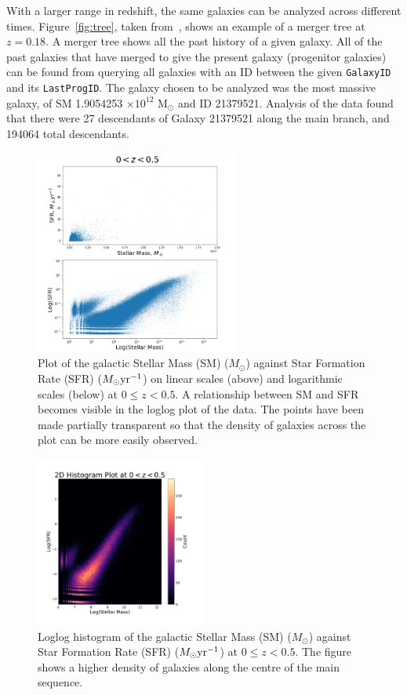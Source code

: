 \documentclass[12pt]{article}
\begin{document}
With a larger range in redshift, the same galaxies can be analyzed across different times.  Figure~\ref{fig:tree}, taken from~\cite{EAGLE}, shows an example of a merger tree at $z=0.18$.  A merger tree shows all the past history of a given galaxy.  All of the past galaxies that have merged to give the present galaxy (progenitor galaxies) can be found from querying all galaxies with an ID between the given {\tt GalaxyID} and its {\tt LastProgID}.  The galaxy chosen to be analyzed was the most massive galaxy, of SM 1.9054253 $\times10^{12}$ M$_\odot$ and ID 21379521.  Analysis of the data found that there were 27 descendants of Galaxy 21379521 along the main branch, and 194064 total descendants.

\begin{figure}[htbp]
  \centerline{\includegraphics[width=0.6\textwidth]{SMvSFR2.png}}
  \caption{Plot of the galactic Stellar Mass (SM) ($M_\odot$) against Star Formation Rate (SFR) ($M_\odot\rm{yr}^{-1}$) on linear scales (above) and logarithmic scales (below) at $0\leq z < 0.5$.  A relationship between SM and SFR becomes visible in the loglog plot of the data.  The points have been made partially transparent so that the density of galaxies across the plot can be more easily observed.}
  \label{fig:SMvSFR2}
\end{figure}

\begin{figure}[htbp]
  \centerline{\includegraphics[width=0.5\textwidth]{hist2.pdf}}
    \caption{Loglog histogram of the galactic Stellar Mass (SM) ($M_\odot$) against Star Formation Rate (SFR) ($M_\odot\rm{yr}^{-1}$) at $0\leq z < 0.5$.  The figure shows a higher density of galaxies along the centre of the main sequence.}
    \label{fig:hist2}
\end{figure}
\end{document}
